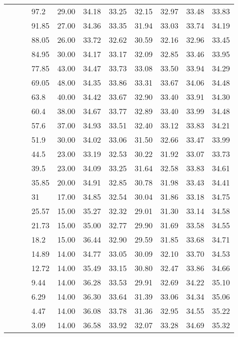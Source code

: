 \begin{longtable}{llllrrrrrrr}
   &  &  & 97.2 & 29.00 & 34.18 & 33.25 & 32.15 & 32.97 & 33.48 & 33.83 \\ 
   &  &  & 91.85 & 27.00 & 34.36 & 33.35 & 31.94 & 33.03 & 33.74 & 34.19 \\ 
   &  &  & 88.05 & 26.00 & 33.72 & 32.62 & 30.59 & 32.16 & 32.96 & 33.45 \\ 
   &  &  & 84.95 & 30.00 & 34.17 & 33.17 & 32.09 & 32.85 & 33.46 & 33.95 \\ 
   &  &  & 77.85 & 43.00 & 34.47 & 33.73 & 33.08 & 33.50 & 33.94 & 34.29 \\ 
   &  &  & 69.05 & 48.00 & 34.35 & 33.86 & 33.31 & 33.67 & 34.06 & 34.48 \\ 
   &  &  & 63.8 & 40.00 & 34.42 & 33.67 & 32.90 & 33.40 & 33.91 & 34.30 \\ 
   &  &  & 60.4 & 38.00 & 34.67 & 33.77 & 32.89 & 33.40 & 33.99 & 34.48 \\ 
   &  &  & 57.6 & 37.00 & 34.93 & 33.51 & 32.40 & 33.12 & 33.83 & 34.21 \\ 
   &  &  & 51.9 & 30.00 & 34.02 & 33.06 & 31.50 & 32.66 & 33.47 & 33.99 \\ 
   &  &  & 44.5 & 23.00 & 33.19 & 32.53 & 30.22 & 31.92 & 33.07 & 33.73 \\ 
   &  &  & 39.5 & 23.00 & 34.09 & 33.25 & 31.64 & 32.58 & 33.83 & 34.61 \\ 
   &  &  & 35.85 & 20.00 & 34.91 & 32.85 & 30.78 & 31.98 & 33.43 & 34.41 \\ 
   &  &  & 31 & 17.00 & 34.85 & 32.54 & 30.04 & 31.86 & 33.18 & 34.75 \\ 
   &  &  & 25.57 & 15.00 & 35.27 & 32.32 & 29.01 & 31.30 & 33.14 & 34.58 \\ 
   &  &  & 21.73 & 15.00 & 35.00 & 32.77 & 29.90 & 31.69 & 33.58 & 34.55 \\ 
   &  &  & 18.2 & 15.00 & 36.44 & 32.90 & 29.59 & 31.85 & 33.68 & 34.71 \\ 
   &  &  & 14.89 & 14.00 & 34.77 & 33.05 & 30.09 & 32.10 & 33.70 & 34.53 \\ 
   &  &  & 12.72 & 14.00 & 35.49 & 33.15 & 30.80 & 32.47 & 33.86 & 34.66 \\ 
   &  &  & 9.44 & 14.00 & 36.28 & 33.53 & 29.91 & 32.69 & 34.22 & 35.10 \\ 
   &  &  & 6.29 & 14.00 & 36.30 & 33.64 & 31.39 & 33.06 & 34.34 & 35.06 \\ 
   &  &  & 4.47 & 14.00 & 36.08 & 33.78 & 31.36 & 32.95 & 34.55 & 35.22 \\ 
   &  &  & 3.09 & 14.00 & 36.58 & 33.92 & 32.07 & 33.28 & 34.69 & 35.32 \\ 

\end{longtable}

